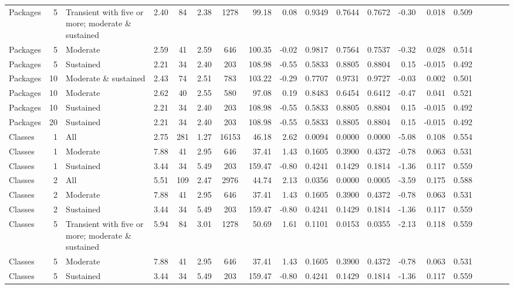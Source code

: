 \begin{table}[H]
{\begin{tabular}{l r p{4cm} c c c c r r r r r r r r r r r r}
Packages & 5 & Transient with five or more; moderate \& sustained &  2.40 & 84 & 2.38 & 1278 & 99.18 & 0.08 & 0.9349 & 0.7644 & 0.7672 & -0.30 & 0.018 & 0.509 \\ 
Packages & 5 & Moderate &  2.59 & 41 & 2.59 & 646 & 100.35 & -0.02 & 0.9817 & 0.7564 & 0.7537 & -0.32 & 0.028 & 0.514 \\ 
Packages & 5 & Sustained &  2.21 & 34 & 2.40 & 203 & 108.98 & -0.55 & 0.5833 & 0.8805 & 0.8804 & 0.15 & -0.015 & 0.492 \\ 
Packages & 10 & Moderate \& sustained &  2.43 & 74 & 2.51 & 783 & 103.22 & -0.29 & 0.7707 & 0.9731 & 0.9727 & -0.03 & 0.002 & 0.501 \\ 
Packages & 10 & Moderate &  2.62 & 40 & 2.55 & 580 & 97.08 & 0.19 & 0.8483 & 0.6454 & 0.6412 & -0.47 & 0.041 & 0.521 \\ 
Packages & 10 & Sustained &  2.21 & 34 & 2.40 & 203 & 108.98 & -0.55 & 0.5833 & 0.8805 & 0.8804 & 0.15 & -0.015 & 0.492 \\ 
Packages & 20 & Sustained &  2.21 & 34 & 2.40 & 203 & 108.98 & -0.55 & 0.5833 & 0.8805 & 0.8804 & 0.15 & -0.015 & 0.492 \\ 
Classes & 1 & All &  2.75 & 281 & 1.27 & 16153 & 46.18 & 2.62 & 0.0094 & 0.0000 & 0.0000 & -5.08 & 0.108 & 0.554 \\ 
Classes & 1 & Moderate &  7.88 & 41 & 2.95 & 646 & 37.41 & 1.43 & 0.1605 & 0.3900 & 0.4372 & -0.78 & 0.063 & 0.531 \\ 
Classes & 1 & Sustained &  3.44 & 34 & 5.49 & 203 & 159.47 & -0.80 & 0.4241 & 0.1429 & 0.1814 & -1.36 & 0.117 & 0.559 \\ 
Classes & 2 & All &  5.51 & 109 & 2.47 & 2976 & 44.74 & 2.13 & 0.0356 & 0.0000 & 0.0005 & -3.59 & 0.175 & 0.588 \\ 
Classes & 2 & Moderate &  7.88 & 41 & 2.95 & 646 & 37.41 & 1.43 & 0.1605 & 0.3900 & 0.4372 & -0.78 & 0.063 & 0.531 \\ 
Classes & 2 & Sustained &  3.44 & 34 & 5.49 & 203 & 159.47 & -0.80 & 0.4241 & 0.1429 & 0.1814 & -1.36 & 0.117 & 0.559 \\ 
Classes & 5 & Transient with five or more; moderate \& sustained &  5.94 & 84 & 3.01 & 1278 & 50.69 & 1.61 & 0.1101 & 0.0153 & 0.0355 & -2.13 & 0.118 & 0.559 \\ 
Classes & 5 & Moderate &  7.88 & 41 & 2.95 & 646 & 37.41 & 1.43 & 0.1605 & 0.3900 & 0.4372 & -0.78 & 0.063 & 0.531 \\ 
Classes & 5 & Sustained &  3.44 & 34 & 5.49 & 203 & 159.47 & -0.80 & 0.4241 & 0.1429 & 0.1814 & -1.36 & 0.117 & 0.559 \\ 

\end{tabular}}
\end{table}
